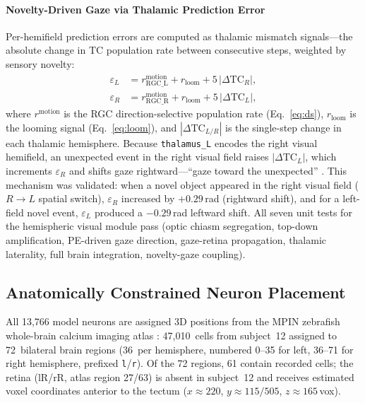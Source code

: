 \documentclass[12pt]{article}
\begin{document}
\paragraph{Novelty-Driven Gaze via Thalamic Prediction Error}

Per-hemifield prediction errors are computed as thalamic mismatch
signals---the absolute change in TC population rate between consecutive
steps, weighted by sensory novelty:
\begin{align}\label{eq:hemifield_pe}
  \varepsilon_L &= r_\text{RGC\_L}^\text{motion}
    + r_\text{loom} + 5\,|\Delta\text{TC}_R|, \nonumber\\
  \varepsilon_R &= r_\text{RGC\_R}^\text{motion}
    + r_\text{loom} + 5\,|\Delta\text{TC}_L|,
\end{align}
where $r^\text{motion}$ is the RGC direction-selective population rate
(Eq.~\ref{eq:ds}), $r_\text{loom}$ is the looming signal (Eq.~\ref{eq:loom}),
and $|\Delta\text{TC}_{L/R}|$ is the single-step change in each thalamic
hemisphere.
Because \texttt{thalamus\_L} encodes the right visual hemifield,
an unexpected event in the right visual field raises $|\Delta\text{TC}_L|$,
which increments $\varepsilon_R$ and shifts gaze rightward---``gaze toward
the unexpected'' \citep{friston2012,itti2009}.
This mechanism was validated: when a novel object appeared in the right
visual field ($R \to L$ spatial switch), $\varepsilon_R$ increased by
$+0.29$\,rad (rightward shift), and for a left-field novel event,
$\varepsilon_L$ produced a $-0.29$\,rad leftward shift.
All seven unit tests for the hemispheric visual module pass
(optic chiasm segregation, top-down amplification,
PE-driven gaze direction, gaze-retina propagation,
thalamic laterality, full brain integration, novelty-gaze coupling).

\subsection{Anatomically Constrained Neuron Placement}\label{sec:atlas}

All 13,766 model neurons are assigned 3D positions from the MPIN zebrafish
whole-brain calcium imaging atlas \citep{kunst2019}:
47,010~cells from subject~12 assigned to 72~bilateral brain regions
(36~per hemisphere, numbered 0--35 for left, 36--71 for right hemisphere,
prefixed \texttt{l}/\texttt{r}).
Of the 72 regions, 61 contain recorded cells; the retina (lR/rR, atlas region
27/63) is absent in subject~12 and receives estimated voxel coordinates
anterior to the tectum ($x\approx220$, $y\approx115/505$, $z\approx165$\,vox).
\end{document}
